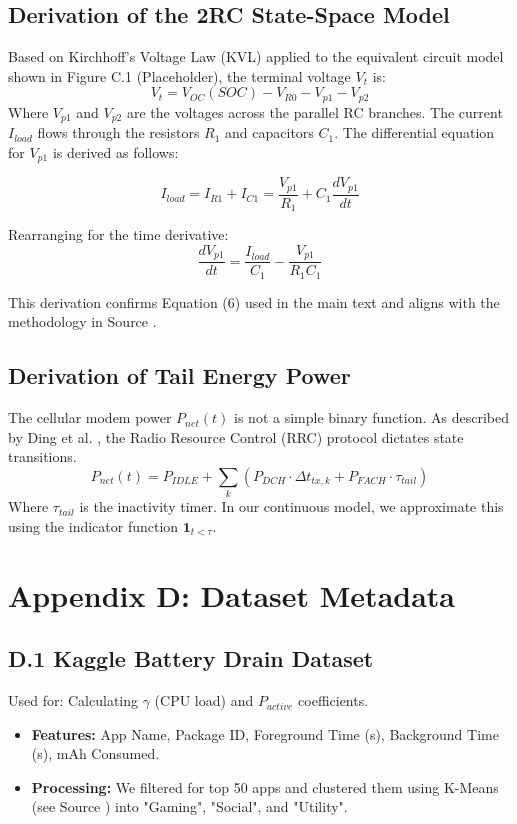 \documentclass[12pt]{article}
\begin{document}
\subsection*{Derivation of the 2RC State-Space Model}
Based on Kirchhoff's Voltage Law (KVL) applied to the equivalent circuit model shown in Figure C.1 (Placeholder), the terminal voltage $V_t$ is:
\[ V_t = V_{OC}(SOC) - V_{R0} - V_{p1} - V_{p2} \]
Where $V_{p1}$ and $V_{p2}$ are the voltages across the parallel RC branches. The current $I_{load}$ flows through the resistors $R_1$ and capacitors $C_1$. The differential equation for $V_{p1}$ is derived as follows:

\[ I_{load} = I_{R1} + I_{C1} = \frac{V_{p1}}{R_1} + C_1 \frac{dV_{p1}}{dt} \]

Rearranging for the time derivative:
\[ \frac{dV_{p1}}{dt} = \frac{I_{load}}{C_1} - \frac{V_{p1}}{R_1 C_1} \]

This derivation confirms Equation (6) used in the main text and aligns with the methodology in Source \cite{6}.

\subsection*{Derivation of Tail Energy Power}
The cellular modem power $P_{net}(t)$ is not a simple binary function. As described by Ding et al. \cite{13}, the Radio Resource Control (RRC) protocol dictates state transitions.
\[ P_{net}(t) = P_{IDLE} + \sum_{k} (P_{DCH} \cdot \Delta t_{tx, k} + P_{FACH} \cdot \tau_{tail}) \]
Where $\tau_{tail}$ is the inactivity timer. In our continuous model, we approximate this using the indicator function $\mathbf{1}_{t < \tau}$.

\newpage

\section{Appendix D: Dataset Metadata}

\subsection*{D.1 Kaggle Battery Drain Dataset}
Used for: Calculating $\gamma$ (CPU load) and $P_{active}$ coefficients.
\begin{itemize}
    \item \textbf{Features:} App Name, Package ID, Foreground Time (s), Background Time (s), mAh Consumed.
    \item \textbf{Processing:} We filtered for top 50 apps and clustered them using K-Means (see Source \cite{12}) into "Gaming", "Social", and "Utility".
\end{itemize}
\end{document}
